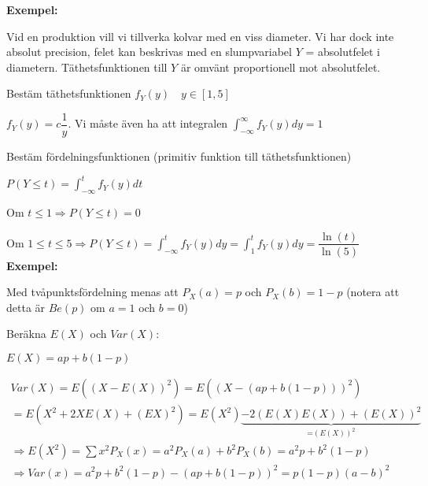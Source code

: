 \par\bigskip
\noindent\textbf{Exempel:}\par
\noindent Vid en produktion vill vi tillverka kolvar med en viss diameter. Vi har dock inte absolut precision, felet kan beskrivas med en slumpvariabel $Y$ = absolutfelet i diametern. Täthetsfunktionen till $Y$ är omvänt proportionell mot absolutfelet.
\par\bigskip
\noindent Bestäm täthetsfunktionen $f_Y(y)\quad y\in[1,5]$\par
\noindent $f_Y(y) = c\dfrac{1}{y}$. Vi måste även ha att integralen $\int_{-\infty}^{\infty}f_Y(y)dy=1$
\par\bigskip
\noindent Bestäm fördelningsfunktionen (primitiv funktion till täthetsfunktionen)\par
\noindent $P(Y\leq t) = \int_{-\infty}^{t}f_Y(y)dt$\par
\noindent Om $t\leq1\Rightarrow P(Y\leq t)=0$\par
\noindent Om $1\leq t\leq5\Rightarrow P(Y\leq t) = \int_{-\infty}^{t}f_Y(y)dy = \int_{1}^{t}f_Y(y)dy=\dfrac{\ln(t)}{\ln(5)}$
\newpage
\noindent\textbf{Exempel:}\par
\noindent Med tvåpunktsfördelning menas att $P_X(a)=p$ och $P_X(b)=1-p$ (notera att detta är $Be(p)$ om $a=1$ och $b=0$)\par
\noindent Beräkna $E(X)$ och $Var(X)$:\par
\noindent $E(X) = ap+b(1-p)$\par

\begin{equation*}
  \begin{gathered}
  Var(X) = E((X-E(X))^2) = E((X-(ap+b(1-p)))^2)\\
  =E(X^2+2XE(X)+(EX)^2)=E(X^2)\underbrace{-2(E(X)E(X))+(E(X))^2}_{\text{=$(E(X))^2$}}\\
  \Rightarrow E(X^2) = \sum x^2P_X(x) = a^2P_X(a)+b^2P_X(b) = a^2p+b^2(1-p)\\
  \Rightarrow Var(x) = a^2p+b^2(1-p) - (ap+b(1-p))^2 = p(1-p)(a-b)^2
  \end{gathered}
\end{equation*}
\par\bigskip
